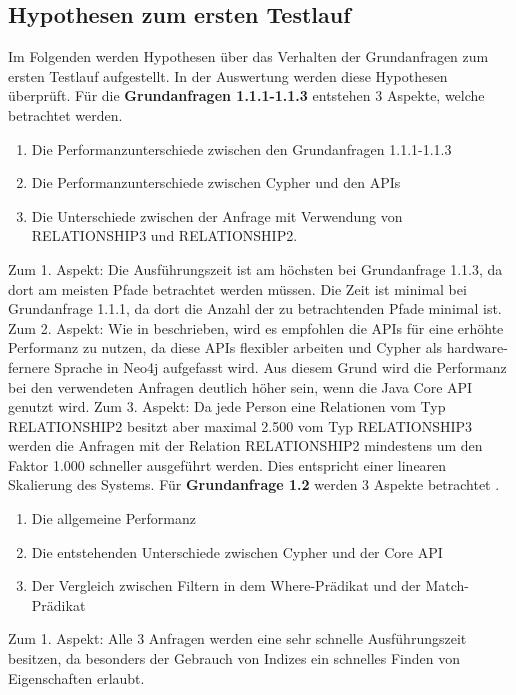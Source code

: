 \subsection{Hypothesen zum ersten Testlauf}
Im Folgenden werden Hypothesen über das Verhalten der Grundanfragen zum ersten Testlauf aufgestellt. In der Auswertung werden diese Hypothesen überprüft. \newline \newline
Für die \textbf{Grundanfragen 1.1.1-1.1.3} entstehen 3 Aspekte, welche betrachtet werden.
\begin{enumerate}
\item Die Performanzunterschiede zwischen den Grundanfragen 1.1.1-1.1.3
\item Die Performanzunterschiede zwischen Cypher und den APIs
\item Die Unterschiede zwischen der Anfrage mit Verwendung von RELATIONSHIP3 und RELATIONSHIP2.
\end{enumerate}
Zum 1. Aspekt: Die Ausführungszeit ist am höchsten bei Grundanfrage 1.1.3, da dort am meisten Pfade betrachtet werden müssen. Die Zeit ist minimal bei Grundanfrage 1.1.1, da dort die Anzahl der zu betrachtenden Pfade minimal ist. \newline
 Zum 2. Aspekt: Wie in \parencite{raj2015neo4j} beschrieben, wird es empfohlen die APIs für eine erhöhte Performanz zu nutzen, da diese APIs flexibler arbeiten und Cypher als hardware-fernere Sprache in Neo4j aufgefasst wird. Aus diesem Grund wird die Performanz bei den verwendeten Anfragen deutlich höher sein, wenn die Java Core API genutzt wird. \newline
Zum 3. Aspekt: Da jede Person eine Relationen vom Typ RELATIONSHIP2 besitzt aber maximal 2.500 vom Typ RELATIONSHIP3 werden die Anfragen mit der Relation RELATIONSHIP2 mindestens um den Faktor 1.000 schneller ausgeführt werden. Dies entspricht einer linearen Skalierung des Systems. \newline \newline
Für \textbf{Grundanfrage 1.2} werden 3 Aspekte betrachtet .
\begin{enumerate}
	\item Die allgemeine Performanz 
	\item Die entstehenden Unterschiede zwischen Cypher und der Core API
	\item Der Vergleich zwischen Filtern in dem Where-Prädikat und der Match-Prädikat
\end{enumerate}
Zum 1. Aspekt: Alle 3 Anfragen werden eine sehr schnelle Ausführungszeit besitzen, da besonders der Gebrauch von Indizes ein schnelles Finden von Eigenschaften erlaubt. \newline
